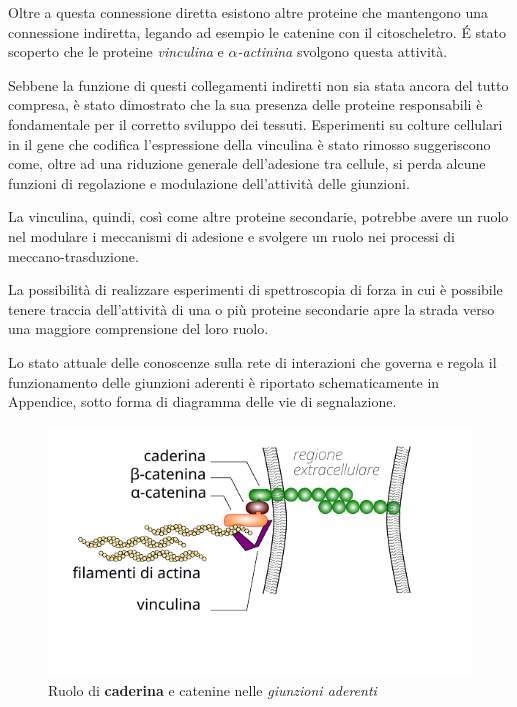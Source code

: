 Oltre a questa connessione diretta esistono altre proteine che
mantengono una connessione indiretta, legando ad esempio le catenine
con il citoscheletro. É stato scoperto \cite{??} che le proteine
\emph{vinculina} e \emph{$\alpha$-actinina} svolgono questa attività.

Sebbene la funzione di questi collegamenti indiretti non sia stata
ancora del tutto compresa, è stato dimostrato che la sua presenza
delle proteine responsabili è fondamentale per il corretto sviluppo
dei tessuti.
Esperimenti su colture cellulari in il gene che codifica l'espressione
della vinculina è stato rimosso suggeriscono come, oltre ad una
riduzione generale dell'adesione tra cellule, si perda alcune funzioni
di regolazione
e modulazione dell'attività delle giunzioni.

La vinculina, quindi, così come altre proteine secondarie, potrebbe
avere un ruolo nel modulare i meccanismi di adesione e svolgere un
ruolo nei processi di meccano-trasduzione.

La possibilità di realizzare esperimenti di spettroscopia di forza in
cui è possibile tenere traccia dell'attività di una o più proteine
secondarie apre la strada verso una maggiore comprensione del loro
ruolo.

Lo stato attuale delle conoscenze sulla rete di interazioni che
governa e regola il funzionamento delle giunzioni aderenti è riportato
schematicamente in Appendice, sotto forma di diagramma delle vie di
segnalazione.

\begin{figure}[ht]
    \centering
    \includegraphics{images/aj.pdf}
    \caption{Ruolo di \textbf{caderina} e catenine nelle
        \textit{giunzioni aderenti}}
    \label{fig:aj}
\end{figure}

